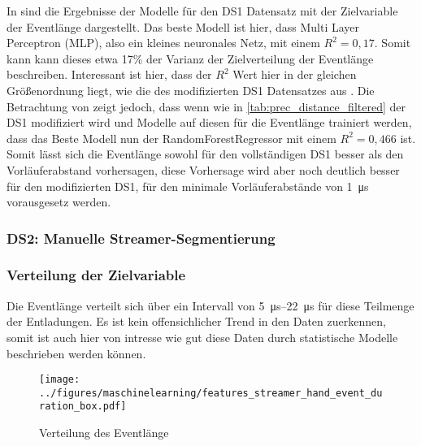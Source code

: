 In  sind die Ergebnisse der Modelle für den DS1 Datensatz mit der Zielvariable der Eventlänge dargestellt. Das beste Modell ist hier, dass Multi Layer Perceptron (MLP), also ein kleines neuronales Netz, mit einem \(R^2 = 0,17\). Somit kann kann dieses etwa 17\% der Varianz der Zielverteilung der Eventlänge beschreiben. Interessant ist hier, dass der \(R^2\) Wert hier in der gleichen Größenordnung liegt, wie die des modifizierten DS1 Datensatzes aus . Die Betrachtung von  zeigt jedoch, dass wenn wie in \ref{tab:prec_distance_filtered} der DS1 modifiziert wird und Modelle auf diesen für die Eventlänge trainiert werden, dass das Beste Modell nun der RandomForestRegressor mit einem \(R^2 = 0,466\) ist. Somit lässt sich die Eventlänge sowohl für den vollständigen DS1 besser als den Vorläuferabstand vorhersagen, diese Vorhersage wird aber noch deutlich besser für den modifizierten DS1, für den minimale Vorläuferabstände von \SI{1}{\micro\second} vorausgesetz werden. 




\subsubsection{DS2: Manuelle Streamer-Segmentierung}

\subsubsection{Verteilung der Zielvariable}
Die Eventlänge verteilt sich über ein Intervall von \SIrange{5}{22}{\micro\second} für diese Teilmenge der Entladungen. Es ist kein offensichlicher Trend in den Daten zuerkennen, somit ist auch hier von intresse wie gut diese Daten durch statistische Modelle beschrieben werden können. 
\begin{figure}[H]
    \centering
      \texttt{[image: ../figures/maschinelearning/features\_streamer\_hand\_event\_duration\_box.pdf]}
      \caption{Verteilung des Eventlänge}
      \label{fig:streamer_hand_event_duration_box}
\end{figure}



